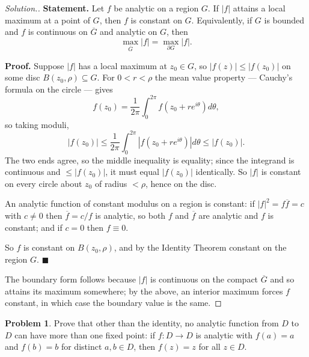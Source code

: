 \documentclass[11pt,a4paper]{article}
\theoremstyle{definition}
\newtheorem{problemx}{Problem}[section]
\newenvironment{problem}{\begin{problemx}}{\end{problemx}}
\newenvironment{solution}
  {\renewcommand{\qedsymbol}{}\begin{proof}[\textit{Solution}.]}
  {\end{proof}}
\begin{document}
\begin{solution}
\textbf{Statement.} Let $f$ be analytic on a region $G$. If $\left|f\right|$
attains a local maximum at a point of $G$, then $f$ is constant on $G$.
Equivalently, if $G$ is bounded and $f$ is continuous on $\overline{G}$ and
analytic on $G$, then
$$\max_{\overline{G}}\left|f\right| = \max_{\partial G}\left|f\right| .$$

\textbf{Proof.} Suppose $\left|f\right|$ has a local maximum at $z_0 \in G$, so
$\left|f(z)\right| \leq \left|f(z_0)\right|$ on some disc $B(z_0,\rho) \subseteq G$.
For $0 < r < \rho$ the mean value property --- Cauchy's formula on the circle ---
gives
$$f(z_0) = \frac{1}{2\pi}\int^{2\pi}_{0} f\!\left(z_0+re^{i\theta}\right)d\theta,$$
so taking moduli,
$$\left|f(z_0)\right| \leq \frac{1}{2\pi}\int^{2\pi}_{0}
\left|f\!\left(z_0+re^{i\theta}\right)\right| d\theta \leq \left|f(z_0)\right| .$$
The two ends agree, so the middle inequality is equality; since the integrand is
continuous and $\leq \left|f(z_0)\right|$, it must equal $\left|f(z_0)\right|$
identically. So $\left|f\right|$ is constant on every circle about $z_0$ of radius
$< \rho$, hence on the disc.

An analytic function of constant modulus on a region is constant: if
$\left|f\right|^{2} = f\overline{f} = c$ with $c \neq 0$ then
$\overline{f} = c/f$ is analytic, so both $f$ and $\overline{f}$ are analytic and
$f$ is constant; and if $c = 0$ then $f \equiv 0$.

So $f$ is constant on $B(z_0,\rho)$, and by the Identity Theorem constant on the
region $G$. $\blacksquare$

The boundary form follows because $\left|f\right|$ is continuous on the compact
$\overline{G}$ and so attains its maximum somewhere; by the above, an interior
maximum forces $f$ constant, in which case the boundary value is the same.
\end{solution}


\begin{problem}
Prove that other than the identity, no analytic function from $D$ to $D$ can have
more than one fixed point: if $f : D \rightarrow D$ is analytic with $f(a) = a$
and $f(b) = b$ for distinct $a, b \in D$, then $f(z) = z$ for all $z \in D$.
\end{problem}
\end{document}
